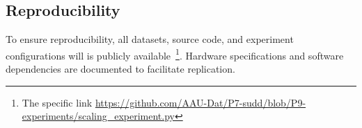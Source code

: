 \subsection{Reproducibility}
To ensure reproducibility, all datasets, source code, and experiment configurations will is publicly available~\cite{p7}\footnote{The specific link \url{https://github.com/AAU-Dat/P7-sudd/blob/P9-experiments/scaling_experiment.py}}. 
Hardware specifications and software dependencies are documented to facilitate replication.